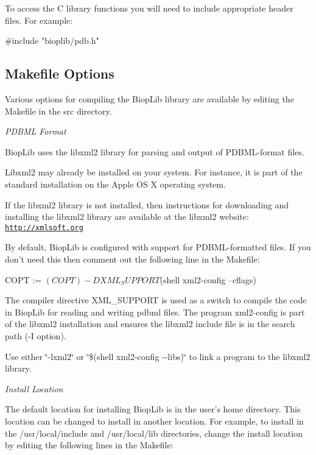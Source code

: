 To access the C library functions you will need to include appropriate header files. For example\-: \begin{DoxyVerb}     #include "bioplib/pdb.h"
\end{DoxyVerb}


\subsection*{Makefile Options }

Various options for compiling the Biop\-Lib library are available by editing the Makefile in the src directory.

{\itshape P\-D\-B\-M\-L Format}

Biop\-Lib uses the libxml2 library for parsing and output of P\-D\-B\-M\-L-\/format files.

Libxml2 may already be installed on your system. For instance, it is part of the standard installation on the Apple O\-S X operating system.

If the libxml2 library is not installed, then instructions for downloading and installing the libxml2 library are available at the libxml2 website\-: \href{http://xmlsoft.org}{\tt http\-://xmlsoft.\-org}

By default, Biop\-Lib is configured with support for P\-D\-B\-M\-L-\/formatted files. If you don't need this then comment out the following line in the Makefile\-: \begin{DoxyVerb}     COPT := $(COPT) -D XML_SUPPORT $(shell xml2-config --cflags)
\end{DoxyVerb}


The compiler directive X\-M\-L\-\_\-\-S\-U\-P\-P\-O\-R\-T is used as a switch to compile the code in Biop\-Lib for reading and writing pdbml files. The program xml2-\/config is part of the libxml2 installation and ensures the libxml2 include file is in the search path (-\/\-I option).

Use either \char`\"{}-\/lxml2\char`\"{} or \char`\"{}\$(shell xml2-\/config -\/-\/libs)\char`\"{} to link a program to the libxml2 library.

{\itshape Install Location}

The default location for installing Biop\-Lib is in the user's home directory. This location can be changed to install in another location. For example, to install in the /usr/local/include and /usr/local/lib directories, change the install location by editing the following lines in the Makefile\-: 


